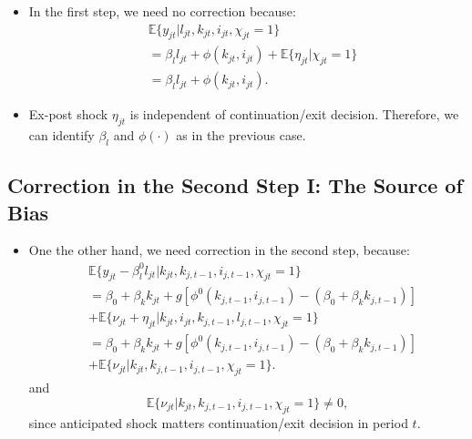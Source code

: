 \documentclass[
]{book}
\providecommand{\tightlist}{%
  \setlength{\itemsep}{0pt}\setlength{\parskip}{0pt}}
\begin{document}
\begin{itemize}
\tightlist
\item
  In the first step, we need no correction because:
  \begin{equation}
  \begin{split}
  &\mathbb{E}\{y_{jt}|l_{jt}, k_{jt}, i_{jt}, \chi_{jt} = 1 \}\\
  &=\beta_l l_{jt} + \phi(k_{jt}, i_{jt}) + \mathbb{E}\{\eta_{jt}|\chi_{jt} = 1\}\\
  &= \beta_l l_{jt} + \phi(k_{jt}, i_{jt}).
  \end{split}
  \end{equation}
\item
  Ex-post shock \(\eta_{jt}\) is independent of continuation/exit decision.
  Therefore, we can identify \(\beta_l\) and \(\phi(\cdot)\) as in the previous case.
\end{itemize}

\hypertarget{correction-in-the-second-step-i-the-source-of-bias}{%
\subsection{Correction in the Second Step I: The Source of Bias}\label{correction-in-the-second-step-i-the-source-of-bias}}

\begin{itemize}
\tightlist
\item
  One the other hand, we need correction in the second step, because:
  \begin{equation}
  \begin{split}
  &\mathbb{E}\{y_{jt} - \beta_l^0 l_{jt}|k_{jt},  k_{j, t - 1}, i_{j, t - 1}, \chi_{jt} = 1\} \\
  &= \beta_0 + \beta_k k_{jt} + g[\phi^0(k_{j, t - 1}, i_{j, t - 1}) - (\beta_0 + \beta_k k_{j, t - 1})]\\
  & + \mathbb{E}\{\nu_{jt} + \eta_{jt}| k_{jt}, i_{jt}, k_{j, t - 1}, l_{j, t - 1}, \chi_{jt} = 1\}\\
  &= \beta_0 + \beta_k k_{jt} + g[\phi^0(k_{j, t - 1}, i_{j, t - 1}) - (\beta_0 + \beta_k k_{j, t - 1})]\\
  & + \mathbb{E}\{\nu_{jt}| k_{jt}, k_{j, t - 1}, i_{j, t - 1} , \chi_{jt} = 1\}.
  \end{split}
  \end{equation}
  and
  \begin{equation}
  \mathbb{E}\{\nu_{jt}| k_{jt}, k_{j, t - 1}, i_{j, t - 1}, \chi_{jt} = 1 \} \neq 0,
  \end{equation}
  since anticipated shock matters continuation/exit decision in period \(t\).
\end{itemize}
\end{document}
